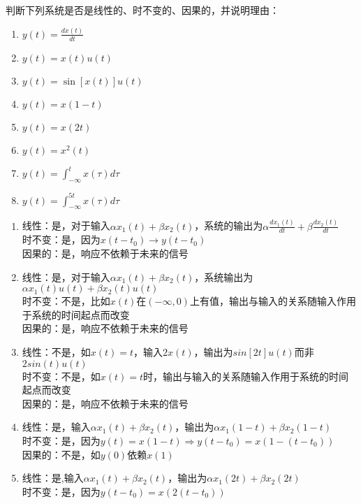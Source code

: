 \documentclass[answers]{exam}
\begin{document}
\begin{questions}
\question 判断下列系统是否是线性的、时不变的、因果的，并说明理由：
\begin{enumerate}[(1)]
	\item $y(t) = \frac{d x(t)}{dt}$
	\item $y(t) = x(t)u(t)$
	\item $y(t) = \sin \left[x(t)\right]u(t)$
	\item $y(t) = x(1-t)$
	\item $y(t) = x(2t)$
	\item $y(t) = x^2(t)$
	\item $y(t) = \int_{-\infty}^t x(\tau) d\tau$
	\item $y(t) = \int_{-\infty}^{5t} x(\tau) d\tau$
\end{enumerate}

\begin{solution}
\begin{enumerate}[(1)]
	\item 线性：是，对于输入$\alpha x_1(t)+\beta x_2(t)$，系统的输出为$\alpha\frac{dx_1(t)}{dt}+\beta\frac{dx_2(t)}{dt}$\\
	时不变：是，因为$x(t-t_0)\rightarrow y(t-t_0)$\\
	因果的：是，响应不依赖于未来的信号\\
	\item 线性：是，对于输入$\alpha x_1(t)+\beta x_2(t)$，系统输出为$\alpha x_1(t)u(t)+\beta x_2(t)u(t)$\\
	时不变：不是，比如$x(t)$在$(-\infty,0)$上有值，输出与输入的关系随输入作用于系统的时间起点而改变\\
	因果的：是，响应不依赖于未来的信号\\
	\item 线性：不是，如$x(t)=t$，输入$2x(t)$，输出为$sin[2t]u(t)$而非$2sin(t)u(t)$\\
	时不变：不是，如$x(t)=t$时，输出与输入的关系随输入作用于系统的时间起点而改变\\
	因果的：是，响应不依赖于未来的信号\\
	\item 线性：是，输入$\alpha x_1(t)+\beta x_2(t)$，输出为$\alpha x_1(1-t)+\beta x_2(1-t)$\\
	时不变：是，因为$y(t)=x(1-t)\Rightarrow y(t-t_0)=x(1-(t-t_0))$\\
	因果的：不是，如$y(0)$依赖$x(1)$\\
	\item 线性：是,输入$\alpha x_1(t)+\beta x_2(t)$，输出为$\alpha x_1(2t)+\beta x_2(2t)$\\
	时不变：是，因为$y(t-t_0)=x(2(t-t_0))$\\

\end{enumerate}
\end{solution}
\end{questions}
\end{document}
